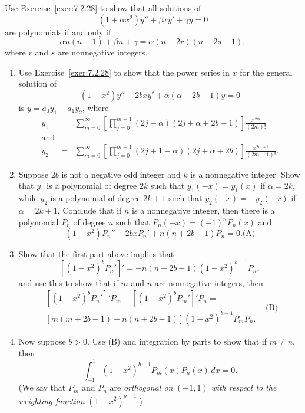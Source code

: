 \documentclass{ximera}
\begin{document}
\begin{problem}\label{exer:7.2.29}
Use Exercise~\ref{exer:7.2.28}  to
 show that  all  solutions of
$$
(1+\alpha x^2)y''+\beta xy'+\gamma y=0
$$
 are polynomials if and only if
$$
\alpha n(n-1)+\beta n+\gamma=\alpha(n-2r)(n-2s-1),
$$
where $r$ and $s$ are nonnegative integers.
\end{problem}

\begin{problem}\label{exer:7.2.30}
\begin{enumerate}
\item %
Use Exercise~\ref{exer:7.2.28}  to show that the power series in $x$
for the general solution of
$$
(1-x^2)y''-2bxy'+\alpha(\alpha+2b-1)y=0
$$
is $y=a_0y_1+a_1y_2$, where
\begin{eqnarray*}
y_1&=&\sum_{m=0}^\infty \left[\prod_{j=0}^{m-1}(2j-\alpha)(2j+\alpha+2b-1)
\right]\frac{x^{2m}}{(2m)!}\\
\mbox{and}\\
y_2&=&\sum_{m=0}^\infty \left[\prod_{j=0}^{m-1}(2j+1-\alpha)(2j+\alpha+2b)
\right]\frac{x^{2m+1}}{(2m+1)!}.
\end{eqnarray*}
\item %
Suppose $2b$ is not a negative odd integer and $k$ is a
nonnegative integer. Show that $y_1$ is a polynomial of degree $2k$
such that $y_1(-x)=y_1(x)$ if $\alpha=2k$, while $y_2$ is a polynomial
of degree $2k+1$ such that $y_2(-x)=-y_2(-x)$ if $\alpha=2k+1$.
Conclude that if $n$ is a nonnegative integer, then there is a
polynomial $P_n$ of degree $n$ such that $P_n(-x)=(-1)^nP_n(x)$ and
$$
(1-x^2)P_n''-2bxP_n'+n(n+2b-1)P_n=0.
\text{(A)}
$$
\item %
Show that the first part above implies that
$$
[(1-x^2)^b P_n']'=-n(n+2b-1)(1-x^2)^{b-1}P_n,
$$
and use this to show that if $m$ and $n$ are nonnegative integers, then
$$
\begin{array}{ll}
[(1-x^2)^bP_n']'P_m-[(1-x^2)^bP_m']'P_n=&\\
\left[m(m+2b-1)-n(n+2b-1)\right](1-x^2)^{b-1}P_mP_n.&
\end{array}
\text{(B)}
$$
\item %
Now suppose $b>0$.
Use (B) and integration by parts to show that
if $m\ne n$, then
$$
\int_{-1}^1 (1-x^2)^{b-1}P_m(x)P_n(x)\,dx=0.
$$
(We say  that $P_m$ and $P_n$ are \emph{orthogonal on}
$(-1,1)$ \emph{with respect to the weighting
function} $(1-x^2)^{b-1}$.)
\end{enumerate}
\end{problem}
\end{document}

